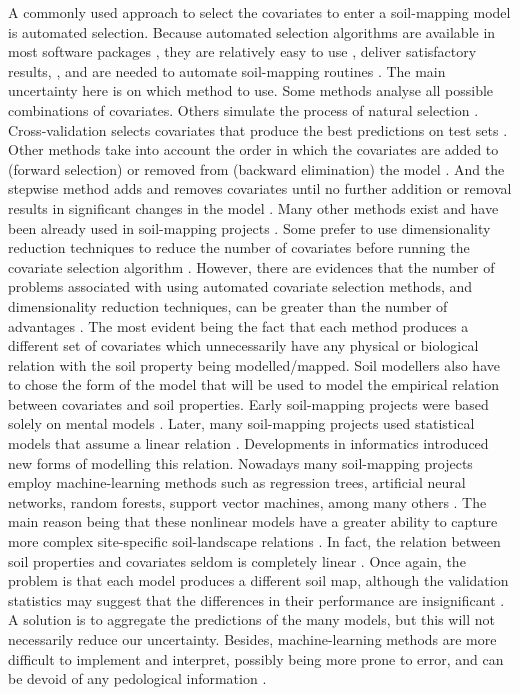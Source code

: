 A commonly used approach to select the covariates to enter a soil-mapping model is automated selection.
Because automated selection algorithms are available in most software packages \cite{Harrell2001a},
they are relatively easy to use \cite{DraperEtAl1971}, deliver satisfactory results,
\cite{HenglEtAl2004}, and are needed to automate soil-mapping routines \cite{HenglEtAl2014}. The
main uncertainty here is on which method to use. Some methods analyse all possible combinations of
covariates. Others simulate the process of natural selection \cite{AndersenEtAl2010}.
Cross-validation selects covariates that produce the best predictions on test sets
\cite{GuyonEtAl2003}. Other methods take into account the order in which the covariates are added
to (forward selection) or removed from (backward elimination) the model \cite{LarkEtAl2007a}. And
the stepwise method adds and removes covariates until no further addition or removal results in
significant changes in the model \cite{DraperEtAl1998}. Many other methods exist and have been
already used in soil-mapping projects \cite{PoggioEtAl2013,NussbaumEtAl2014}. Some prefer to use
dimensionality reduction techniques to reduce the number of covariates \cite{Massy1965} before
running the covariate selection algorithm \cite{tenCatenEtAl2011a,HenglEtAl2014}. However, there
are evidences that the number of problems associated with using automated covariate selection
methods, and dimensionality reduction techniques, can be greater than the number of advantages 
\cite{FarrarEtAl1967, Jackson1993, Chatfield1995, Edirisooriya1995, Harrell2001a, Jolliffe2002, 
Peres-NetoEtAl2005, LarkEtAl2007a}. The most evident being the fact that each method produces a different set 
of covariates which unnecessarily have any physical or biological relation with the soil property being 
modelled/mapped.
Soil modellers also have to chose the form of the model that will be used to model the
empirical relation between covariates and soil properties. Early soil-mapping projects were based
solely on mental models \cite{Hudson1992}. Later, many soil-mapping projects used statistical
models that assume a linear relation \cite{MooreEtAl1993,OdehEtAl1994}. Developments in
informatics introduced new forms of modelling this relation. Nowadays many soil-mapping projects
employ machine-learning methods such as regression trees, artificial neural networks, random forests,
support vector machines, among many others \cite{HeungEtAl2016}. The main reason being that these
nonlinear models have a greater ability to capture more complex site-specific soil-landscape relations
\cite{Grunwald2009}. In fact, the relation between soil properties and covariates seldom is
completely linear \cite{McKenzieEtAl1999}. Once again, the problem is that each model produces a
different soil map, although the validation statistics may suggest that the differences in their
performance are insignificant \cite{HeungEtAl2016}. A solution is to aggregate the predictions of
the many models, but this will not necessarily reduce our uncertainty. Besides, machine-learning
methods are more difficult to implement and interpret, possibly being more prone to error, and can
be devoid of any pedological information \cite{Grunwald2009}.


